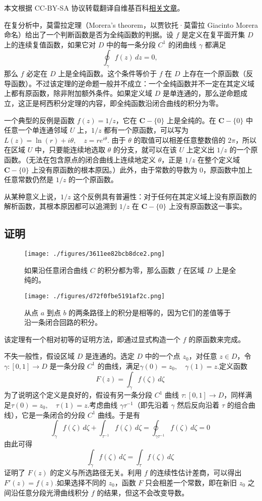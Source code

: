 
本文根据 CC-BY-SA 协议转载翻译自维基百科\href{https://en.wikipedia.org/wiki/Morera\%27s_theorem}{相关文章}。

在复分析中，莫雷拉定理（Morera's theorem，以贾钦托·莫雷拉 Giacinto Morera 命名）给出了一个判断函数是否为全纯函数的判据。设 $f$ 是定义在复平面开集 $D$ 上的连续复值函数，如果它对 $D$ 中的每一条分段 $C^1$ 的闭曲线 $\gamma$ 都满足
$$
\oint_{\gamma} f(z)\,dz = 0,~
$$
那么 $f$ 必定在 $D$ 上是全纯函数。这个条件等价于 $f$ 在 $D$ 上存在一个原函数（反导函数）。不过该定理的逆命题一般并不成立：一个全纯函数并不一定在其定义域上都有原函数，除非附加额外条件。如果定义域 $D$ 是单连通的，那么逆命题成立，这正是柯西积分定理的内容，即全纯函数沿闭合曲线的积分为零。

一个典型的反例是函数 $f(z) = 1/z$，它在 $\mathbf{C} - \{0\}$ 上是全纯的。在 $\mathbf{C} - \{0\}$ 中任意一个单连通邻域 $U$ 上，$1/z$ 都有一个原函数，可以写为$L(z) = \ln(r) + i\theta, \quad z = re^{i\theta}$.
由于 $\theta$ 的取值可以相差任意整数倍的 $2\pi$，所以在区域 $U$ 中，只要能连续地选取 $\theta$ 的分支，就可以在该 $U$ 上定义出 $1/z$ 的一个原函数。（无法在包含原点的闭合曲线上连续地定义 $\theta$，正是 $1/z$ 在整个定义域 $\mathbf{C} - \{0\}$ 上没有原函数的根本原因。）此外，由于常数的导数为 0，原函数中加上任意常数仍然是 $1/z$ 的一个原函数。

从某种意义上说，$1/z$ 这个反例具有普遍性：对于任何在其定义域上没有原函数的解析函数，其根本原因都可以追溯到 $1/z$ 在 $\mathbf{C} - \{0\}$ 上没有原函数这一事实。
\subsection{证明}
\begin{figure}[ht]
\centering
\texttt{[image: ./figures/3611ee82bcb8dce2.png]}
\caption{如果沿任意闭合曲线 $C$ 的积分都为零，那么函数 $f$ 在区域 $D$ 上是全纯的。} \label{fig_MLLdl_1}
\end{figure}
\begin{figure}[ht]
\centering
\texttt{[image: ./figures/d72f0fbe5191af2c.png]}
\caption{从点 $a$ 到点 $b$ 的两条路径上的积分是相等的，因为它们的差值等于沿一条闭合回路的积分。} \label{fig_MLLdl_2}
\end{figure}
该定理有一个相对初等的证明方法，即通过显式构造一个 $f$ 的原函数来完成。

不失一般性，假设区域 $D$ 是连通的。选定 $D$ 中的一个点 $z_0$，对任意 $z \in D$，令 $\gamma: [0,1] \to D$ 是一条分段 $C^1$ 的曲线，满足$\gamma(0) = z_0, \quad \gamma(1) = z$.定义函数
$$
F(z) = \int_{\gamma} f(\zeta)\,d\zeta~
$$
为了说明这个定义是良好的，假设有另一条分段 $C^1$ 曲线 $\tau: [0,1] \to D$，同样满足$\tau(0) = z_0, \quad \tau(1) = z$.考虑曲线 $\gamma \tau^{-1}$（即先沿着 $\gamma$ 然后反向沿着 $\tau$ 的组合曲线），它是一条闭合的分段 $C^1$ 曲线。于是有
$$
\int_{\gamma} f(\zeta)\,d\zeta + \int_{\tau^{-1}} f(\zeta)\,d\zeta
= \oint_{\gamma \tau^{-1}} f(\zeta)\,d\zeta
= 0~
$$
由此可得
$$
\int_{\gamma} f(\zeta)\,d\zeta = \int_{\tau} f(\zeta)\,d\zeta~
$$
证明了 $F(z)$ 的定义与所选路径无关。利用 $f$ 的连续性估计差商，可以得出$
F'(z) = f(z)$.如果选择不同的 $z_0$，函数 $F$ 只会相差一个常数，即在新旧 $z_0$ 之间沿任意分段光滑曲线积分 $f$ 的结果，但这不会改变导数。

